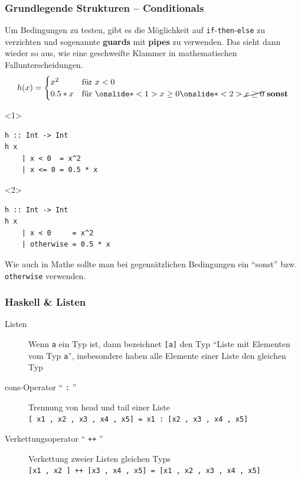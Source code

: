 \documentclass{beamer}
\begin{document}
	\begin{frame}[fragile] \frametitle{Grundlegende Strukturen -- Conditionals}
		\footnotesize
		Um Bedingungen zu testen, gibt es die Möglichkeit auf \texttt{if}-\texttt{then}-\texttt{else} zu verzichten und sogenannte \textbf{guards} mit \textbf{pipes }zu verwenden. Das sieht dann wieder so aus, wie eine geschweifte Klammer in mathematischen Fallunterscheidungen. 
		\begin{equation*}
			h(x) = \begin{cases}
			x^2 & \text{für } x < 0 \\
			0.5*x & \text{für } \onslide*<1>{x \ge 0} \onslide*<2>{\cancel{x \ge 0} \text{ \textbf{sonst}}}
			\end{cases} 
		\end{equation*}
		\begin{onlyenv}<1>
			\begin{lstlisting}
h :: Int -> Int
h x 
	| x < 0  = x^2 
	| x <= 0 = 0.5 * x
			\end{lstlisting}
		\end{onlyenv}
		\begin{onlyenv}<2>
			\begin{lstlisting}
h :: Int -> Int
h x 
	| x < 0     = x^2 
	| otherwise = 0.5 * x
			\end{lstlisting}
		\end{onlyenv}
		\pause
		Wie auch in Mathe sollte man bei gegensätzlichen Bedingungen ein \enquote{sonst} bzw. \texttt{otherwise} verwenden.
	\end{frame}
	\begin{frame}[fragile] \frametitle{Haskell \& Listen}
		\begin{description}
			\item[Listen] Wenn \texttt{a} ein Typ ist, dann bezeichnet \texttt{[a]} den Typ ``Liste mit Elementen vom Typ \texttt{a}'', insbesondere
			haben alle Elemente einer Liste den gleichen Typ
			\pause
			\item[cons-Operator `` \texttt{:} '']  Trennung von head und tail einer Liste \\
			\lstinline{[ x1 , x2 , x3 , x4 , x5] = x1 : [x2 , x3 , x4 , x5]}
			\bigskip \pause
			\item[Verkettungsoperator `` \texttt{++} ''] Verkettung zweier Listen gleichen Typs \\
			\lstinline{[x1 , x2 ] ++ [x3 , x4 , x5] = [x1 , x2 , x3 , x4 , x5]}
		\end{description}
	\end{frame}
\end{document}
